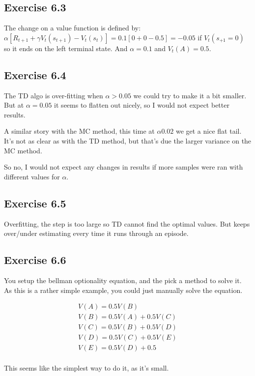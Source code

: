 \subsection{Exercise 6.3}
The change on a value function is defined by:  $\alpha [R_{t+1} + \gamma V_t(s_{t+1})-V_t(s_t)] = 0.1[0 + 0 - 0.5]=-0.05$ if $V_t(s_{+1}=0)$ so it ends on the left terminal state. And $\alpha=0.1$ and $V_t(A)=0.5$.

\subsection{Exercise 6.4}
The TD algo is over-fitting when $\alpha>0.05$ we could try to make it a bit smaller. But at $\alpha=0.05$ it seems to flatten out nicely, so I would not expect better results.

A similar story with the MC method, this time at $\alpha0.02$ we get a nice flat tail. It's not as clear as with the TD method, but that's due the larger variance on the MC method.

So no, I would not expect any changes in results if more samples were ran with different values for $\alpha$.

\subsection{Exercise 6.5}
Overfitting, the step is too large so TD cannot find the optimal values. But keeps over/under estimating every time it runs through an episode.

\subsection{Exercise 6.6}
You setup the bellman optionality equation, and the pick a method to solve it. As this is a rather simple example, you could just manually solve the equation.

\begin{equation}
\begin{split}
V(A) = 0.5 V(B)\\
V(B) = 0.5 V(A) + 0.5 V(C)\\
V(C) = 0.5 V(B) + 0.5 V(D)\\
V(D) = 0.5 V(C) + 0.5 V(E)\\
V(E) = 0.5 V(D) + 0.5\\
\end{split}
\end{equation}

This seems like the simplest way to do it, as it's small.


